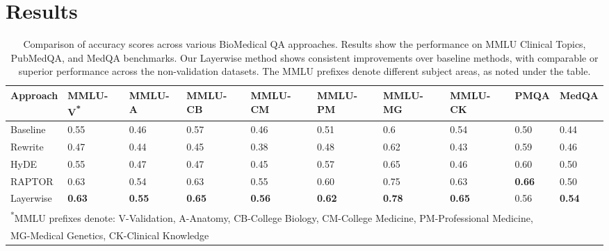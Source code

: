 \documentclass[11pt]{article}
\theoremstyle{definition}
\begin{document}
\section{Results}

\begin{table}[h]
\begin{center}
\begin{tabular}{p{2.2cm}|p{1.15cm}|p{1.15cm}|p{1.15cm}|p{1.15cm}|p{1.15cm}|p{1.15cm}|p{1.15cm}|p{1.15cm}|p{1.15cm}}
    \hline
     Approach & MMLU-V\textsuperscript{*} & MMLU-A & MMLU-CB & MMLU-CM & MMLU-PM & MMLU-MG & MMLU-CK & PMQA & MedQA \\
     \hline
     Baseline & 0.55 & 0.46 & 0.57 & 0.46 & 0.51 & 0.6 & 0.54 & 0.50 & 0.44 \\
     Rewrite & 0.47 & 0.44 & 0.45 & 0.38 & 0.48 & 0.62 & 0.43 & 0.59 & 0.46 \\
     HyDE & 0.55 & 0.47 & 0.47 & 0.45 & 0.57 & 0.65 & 0.46 & 0.60 & 0.50 \\
     RAPTOR & 0.63 & 0.54 & 0.63 & 0.55 & 0.60 & 0.75 & 0.63 & \textbf{0.66} & 0.50 \\
     Layerwise & \textbf{0.63} & \textbf{0.55} & \textbf{0.65} & \textbf{0.56} & \textbf{0.62} & \textbf{0.78} & \textbf{0.65} & 0.56 & \textbf{0.54} \\
    \hline
     \multicolumn{10}{l}{\footnotesize \textsuperscript{*}MMLU prefixes denote: V-Validation, A-Anatomy, CB-College Biology, CM-College Medicine, PM-Professional Medicine, }\\
     \multicolumn{10}{l}{\footnotesize MG-Medical Genetics, CK-Clinical Knowledge}\\
    \end{tabular}
\end{center}
\caption{Comparison of accuracy scores across various BioMedical QA approaches. Results show the performance on MMLU Clinical Topics, PubMedQA, and MedQA benchmarks. Our Layerwise method shows consistent improvements over baseline methods, with comparable or superior performance across the non-validation datasets. The MMLU prefixes denote different subject areas, as noted under the table.  }
\label{table:QAAcc}
\end{table}
\end{document}
